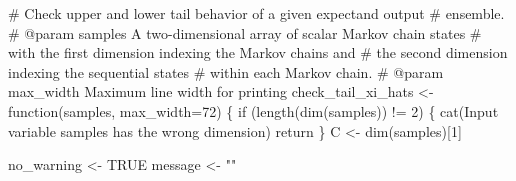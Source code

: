 \documentclass[
  letterpaper,
  DIV=11,
  numbers=noendperiod]{scrartcl}
\newenvironment{Shaded}{\begin{snugshade}}{\end{snugshade}}
\newcommand{\AttributeTok}[1]{\textcolor[rgb]{0.40,0.45,0.13}{#1}}
\newcommand{\CommentTok}[1]{\textcolor[rgb]{0.37,0.37,0.37}{#1}}
\newcommand{\ConstantTok}[1]{\textcolor[rgb]{0.56,0.35,0.01}{#1}}
\newcommand{\ControlFlowTok}[1]{\textcolor[rgb]{0.00,0.23,0.31}{#1}}
\newcommand{\DecValTok}[1]{\textcolor[rgb]{0.68,0.00,0.00}{#1}}
\newcommand{\FunctionTok}[1]{\textcolor[rgb]{0.28,0.35,0.67}{#1}}
\newcommand{\NormalTok}[1]{\textcolor[rgb]{0.00,0.23,0.31}{#1}}
\newcommand{\OtherTok}[1]{\textcolor[rgb]{0.00,0.23,0.31}{#1}}
\newcommand{\SpecialCharTok}[1]{\textcolor[rgb]{0.37,0.37,0.37}{#1}}
\newcommand{\StringTok}[1]{\textcolor[rgb]{0.13,0.47,0.30}{#1}}
\begin{document}
\begin{Shaded}
\begin{Highlighting}[]
\CommentTok{\# Check upper and lower tail behavior of a given expectand output }
\CommentTok{\# ensemble.}
\CommentTok{\# @param samples A two{-}dimensional array of scalar Markov chain states }
\CommentTok{\#                with the first dimension indexing the Markov chains and }
\CommentTok{\#                the second dimension indexing the sequential states }
\CommentTok{\#                within each Markov chain.}
\CommentTok{\# @param max\_width Maximum line width for printing}
\NormalTok{check\_tail\_xi\_hats }\OtherTok{\textless{}{-}} \ControlFlowTok{function}\NormalTok{(samples, }\AttributeTok{max\_width=}\DecValTok{72}\NormalTok{) \{}
  \ControlFlowTok{if}\NormalTok{ (}\FunctionTok{length}\NormalTok{(}\FunctionTok{dim}\NormalTok{(samples)) }\SpecialCharTok{!=} \DecValTok{2}\NormalTok{) \{}
    \FunctionTok{cat}\NormalTok{(}\StringTok{\textquotesingle{}Input variable \textasciigrave{}samples\textasciigrave{} has the wrong dimension\textquotesingle{}}\NormalTok{)}
\NormalTok{    return}
\NormalTok{  \}}
\NormalTok{  C }\OtherTok{\textless{}{-}} \FunctionTok{dim}\NormalTok{(samples)[}\DecValTok{1}\NormalTok{]}
  
\NormalTok{  no\_warning }\OtherTok{\textless{}{-}} \ConstantTok{TRUE}
\NormalTok{  message }\OtherTok{\textless{}{-}} \StringTok{""}
  

\end{Highlighting}
\end{Shaded}
\end{document}
